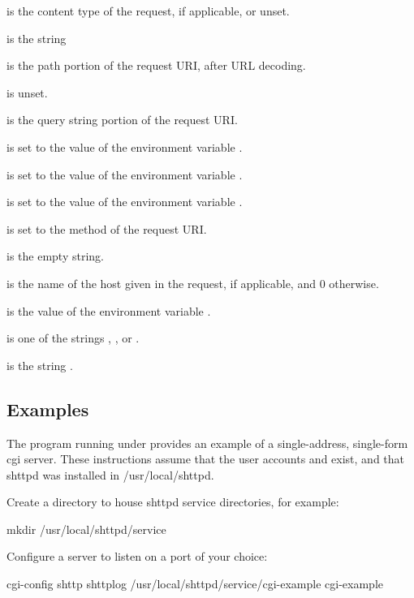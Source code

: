\documentclass{book}
\begin{document}
 is the content type of the request, if
applicable, or unset.

 is the string 

 is the path portion of the request URI, after URL
decoding.

 is unset.

 is the query string portion of the request URI.

 is set to the value of the environment variable .

 is set to the value of the environment variable .

 is set to the value of the environment variable .

 is set to the method of the request URI.

 is the empty string.

 is the name of the host given in the request, if
applicable, and 0 otherwise.

 is the value of the environment variable .

 is one of the strings ,
, or .

 is the string .


\subsection{Examples}
The  program running under  provides
an example of a single-address, single-form cgi server.  These
instructions assume that the user accounts  and
 exist, and that shttpd was installed in
/usr/local/shttpd.

Create a directory to house shttpd service directories, for example:
\begin{code}
  mkdir /usr/local/shttpd/service
\end{code}

Configure a  server to listen on a port of your choice:
\begin{code}
  cgi-config shttp shttplog /usr/local/shttpd/service/cgi-example  cgi-example
\end{code}
\end{document}
